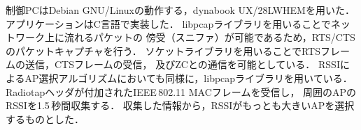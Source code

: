 \documentclass[technicalreport]{ieicej}
\begin{document}


制御PCはDebian GNU/Linuxの動作する，dynabook UX/28LWHEMを用いた．
アプリケーションはC言語で実装した．
libpcapライブラリを用いることでネットワーク上に流れるパケットの
傍受（スニファ）が可能であるため，RTS/CTSのパケットキャプチャを行う．
ソケットライブラリを用いることでRTSフレームの送信，CTSフレームの受信，
及びZCとの通信を可能としている．
RSSIによるAP選択アルゴリズムにおいても同様に，libpcapライブラリを用いている．
Radiotapヘッダが付加されたIEEE\,802.11 MACフレームを受信し，
周囲のAPのRSSIを1.5\,秒間収集する．
収集した情報から，RSSIがもっとも大きいAPを選択するものとした．

\end{document}
